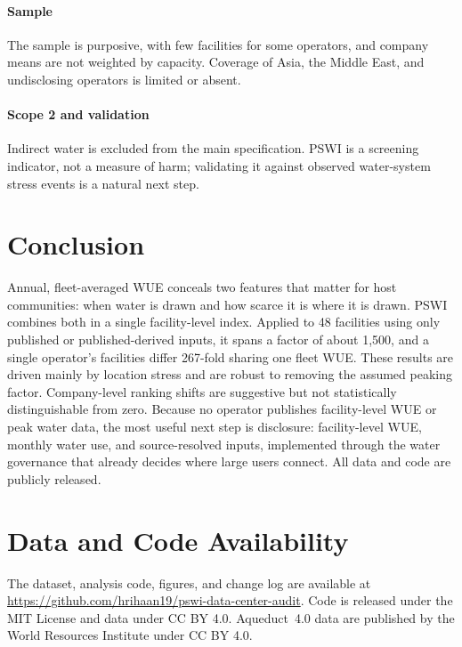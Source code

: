 \documentclass[conference,10pt]{IEEEtran}
\begin{document}
\paragraph{Sample}
The sample is purposive, with few facilities for some operators, and
company means are not weighted by capacity. Coverage of Asia, the Middle
East, and undisclosing operators is limited or absent.

\paragraph{Scope 2 and validation}
Indirect water is excluded from the main specification. PSWI is a screening
indicator, not a measure of harm; validating it against observed
water-system stress events is a natural next step.

\section{Conclusion}
\label{sec:conclusion}

Annual, fleet-averaged WUE conceals two features that matter for host
communities: when water is drawn and how scarce it is where it is drawn.
PSWI combines both in a single facility-level index. Applied to 48
facilities using only published or published-derived inputs, it spans a
factor of about 1{,}500, and a single operator's facilities differ 267-fold
sharing one fleet WUE. These results are driven mainly by location
stress and are robust to removing the assumed peaking factor. Company-level
ranking shifts are suggestive but not statistically distinguishable from
zero. Because no operator publishes facility-level WUE or peak water data,
the most useful next step is disclosure: facility-level WUE, monthly water
use, and source-resolved inputs, implemented through the water governance
that already decides where large users connect. All data and code are
publicly released.

\section*{Data and Code Availability}

The dataset, analysis code, figures, and change log are available at
\url{https://github.com/hrihaan19/pswi-data-center-audit}. Code is released
under the MIT License and data under CC BY 4.0. Aqueduct~4.0 data are
published by the World Resources Institute under CC BY 4.0.
\end{document}
